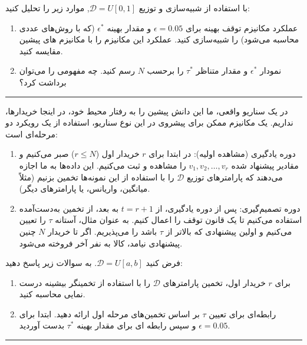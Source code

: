 \documentclass[a4paper]{article}
\begin{document}
\vspace{5mm}{\color{SimQColor}\hrule}
\begin{SimQuestion}
	با استفاده از شبیه‌سازی  و توزیع $\mathcal{D}=U[0,1]$, موارد زیر را تحلیل کنید:

	\begin{enumerate}
		\item عملکرد مکانیزم توقف بهینه برای $\epsilon=0.05$ و مقدار بهینه $\epsilon^*$ (که با روش‌های عددی محاسبه می‌شود) را شبیه‌سازی کنید. عملکرد این مکانیزم را با مکانیزم های پیشین مقایسه کنید.
		\item نمودار $\epsilon^*$ و مقدار متناظر $\tau^*$ را برحسب $N$ رسم کنید. چه مفهومی را می‌توان برداشت کرد؟
	\end{enumerate}
\end{SimQuestion}
{\color{SimQColor}\hrule}\vspace{5mm}

در یک سناریو واقعی، ما این دانش پیشین را به رفتار محیط خود، در اینجا خریدارها، نداریم.  
یک مکانیزم ممکن برای پیشروی در این نوع سناریو، استفاده از یک رویکرد دو مرحله‌ای است:  

\begin{enumerate}
	\item دوره یادگیری (مشاهده اولیه): در ابتدا برای $r$ خریدار اول ($r \leq N$) صبر می‌کنیم و مقادیر پیشنهاد شده $v_1, v_2, \dots, v_r$ را مشاهده و ثبت می‌کنیم. این داده‌ها به ما اجازه می‌دهند که پارامترهای توزیع $\mathcal{D}$ را با استفاده از این نمونه‌ها تخمین بزنیم (مثلاً میانگین، واریانس، یا پارامترهای دیگر).  
	\item دوره تصمیم‌گیری: پس از دوره یادگیری، از $t = r + 1$ به بعد، از تخمین به‌دست‌آمده استفاده می‌کنیم تا یک قانون توقف را اعمال کنیم. به عنوان مثال، آستانه $\tau$ را تعیین می‌کنیم و اولین پیشنهادی که بالاتر از $\tau$ باشد را می‌پذیریم. اگر تا خریدار $N$ چنین پیشنهادی نیامد، کالا به نفر آخر فروخته می‌شود.  
\end{enumerate}

\vspace{5mm}{\color{ThQColor}\hrule}
\begin{ThQuestion}
فرض کنید $\mathcal{D}=U[a,b]$. به سوالات زیر پاسخ دهید:

\begin{enumerate}
    \item برای $r$ خریدار اول، تخمین پارامترهای $\mathcal{D}$ را با استفاده از تخمینگر بیشینه درست نمایی محاسبه کنید.
    \item رابطه‌ای برای تعیین $\tau$ بر اساس تخمین‌های مرحله اول ارائه دهید. ابتدا برای $\epsilon=0.05$ و سپس رابطه ای برای مقدار بهینه $\tau^*$ بدست آوردید.
\end{enumerate}
\end{ThQuestion}
{\color{ThQColor}\hrule}\vspace{5mm}
\end{document}
